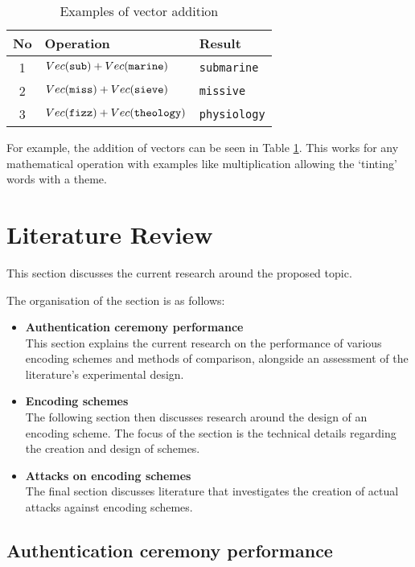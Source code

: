 \begin{table}[!htb]
    \centering
    \begin{tabular}{cll}
        No & Operation & Result \\
        \hline
        1  & $Vec(\verb|sub|) + Vec(\verb|marine|)$ & \verb|submarine| \\
        2  & $Vec(\verb|miss|) + Vec(\verb|sieve|)$ & \verb|missive| \\
        3  & $Vec(\verb|fizz|) + Vec(\verb|theology|)$ & \verb|physiology| \\
    \end{tabular}
    \caption{Examples of vector addition}
    \label{tab:vectorAdd}
\end{table}

For example, the addition of vectors can be seen in Table \ref{tab:vectorAdd}. This works for any mathematical operation with examples like multiplication allowing the `tinting' words with a theme.



\section{Literature Review}
This section discusses the current research around the proposed topic.

The organisation of the section is as follows:

\begin{itemize}
    \item \textbf{Authentication ceremony performance} \\
    This section explains the current research on the performance of various encoding schemes and methods of comparison, alongside an assessment of the literature's experimental design.

    \item \textbf{Encoding schemes} \\
    The following section then discusses research around the design of an encoding scheme. The focus of the section is the technical details regarding the creation and design of schemes. 

    \item \textbf{Attacks on encoding schemes} \\
    The final section discusses literature that investigates the creation of actual attacks against encoding schemes.
\end{itemize}

\subsection{Authentication ceremony performance}

